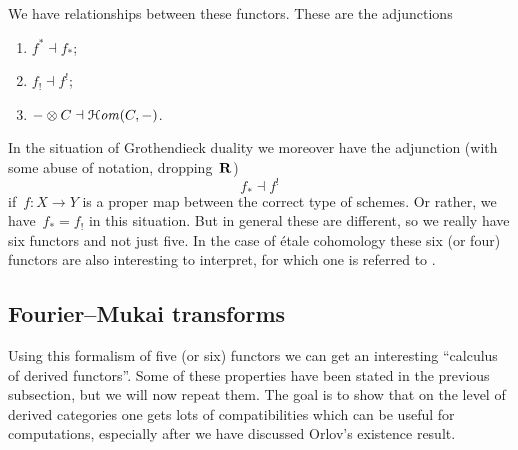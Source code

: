 \documentclass[10pt,a4paper]{article}
\begin{document}
We have relationships between these functors. These are the adjunctions
\begin{enumerate}
  \item $f^*\dashv f_*$;
  \item $f_!\dashv f^!$;
  \item $-\otimes C\dashv \operatorname{\mathcal{H}\mathit{om}}(C,-)$.
\end{enumerate}
In the situation of Grothendieck duality we moreover have the adjunction (with some abuse of notation, dropping~$\mathbf{R}$)
\begin{equation}
  f_*\dashv f^!
\end{equation}
if~$f\colon X\to Y$ is a proper map between the correct type of schemes. Or rather, we have~$f_*=f_!$ in this situation. But in general these are different, so we really have six functors and not just five. In the case of \'etale cohomology these six (or four) functors are also interesting to interpret, for which one is referred to \cite{milne-etale-cohomology}.

\subsection{Fourier--Mukai transforms}
Using this formalism of five (or six) functors we can get an interesting ``calculus of derived functors''. Some of these properties have been stated in the previous subsection, but we will now repeat them. The goal is to show that on the level of derived categories one gets lots of compatibilities which can be useful for computations, especially after we have discussed Orlov's existence result.
\end{document}
